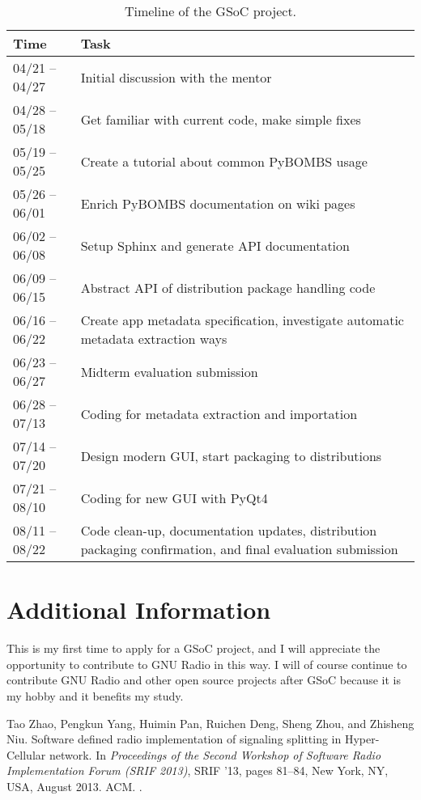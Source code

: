 \documentclass[a4paper]{article}
\begin{document}
\begin{table}[htbp]
  \centering
  \begin{tabular}{lp{}}
    \hline
    Time & Task \\
    \hline
    04/21 -- 04/27 & Initial discussion with the mentor \\
    04/28 -- 05/18 & Get familiar with current code, make simple fixes \\
    05/19 -- 05/25 & Create a tutorial about common PyBOMBS usage\\
    05/26 -- 06/01 & Enrich PyBOMBS documentation on wiki pages \\
    06/02 -- 06/08 & Setup Sphinx and generate API documentation \\
    06/09 -- 06/15 & Abstract API of distribution package handling code \\
    06/16 -- 06/22 & Create app metadata specification, investigate
    automatic metadata extraction ways\\
    06/23 -- 06/27 & Midterm evaluation submission\\
    06/28 -- 07/13 & Coding for metadata extraction and importation \\
    07/14 -- 07/20 & Design modern GUI, start packaging to distributions \\
    07/21 -- 08/10 & Coding for new GUI with PyQt4 \\
    08/11 -- 08/22 & Code clean-up, documentation updates, distribution
    packaging confirmation, and final evaluation submission \\
    \hline
  \end{tabular}
  \caption{Timeline of the GSoC project.}
  \label{tab:timeline}
\end{table}

\section*{Additional Information}

This is my first time to apply for a GSoC project, and I will appreciate the
opportunity to contribute to GNU Radio in this way. I will of course
continue to contribute GNU Radio and other open source projects after
GSoC because it is my hobby and it benefits my study.

\begin{thebibliography}{1}

Tao Zhao, Pengkun Yang, Huimin Pan, Ruichen Deng, Sheng Zhou, and Zhisheng Niu.
\newblock Software defined radio implementation of signaling splitting in
  {Hyper-Cellular} network.
\newblock In {\em Proceedings of the Second Workshop of Software Radio
  Implementation Forum (SRIF 2013)}, SRIF '13, pages 81--84, New York, NY, USA,
  August 2013. ACM.
\newblock \href {http://dx.doi.org/10.1145/2491246.2491258}
  {}.

\end{thebibliography}
\end{document}
